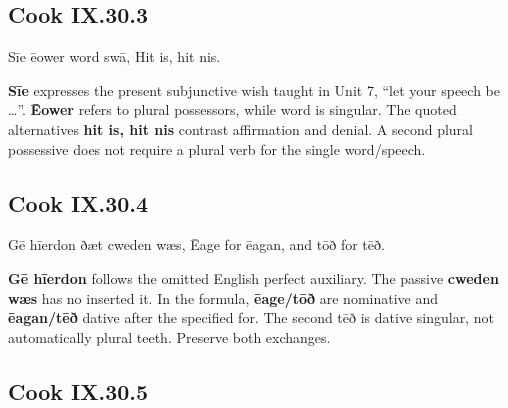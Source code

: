 \subsection*{Cook IX.30.3}

\par\begin{minipage}{\linewidth}\raggedright
Sīe ēower word swā, Hit is, hit nis.

\textbf{Sīe} expresses the present subjunctive wish taught in Unit 7, “let your speech be …”. \textbf{Ēower} refers to plural possessors, while word is singular. The quoted alternatives \textbf{hit is, hit nis} contrast affirmation and denial. A second plural possessive does not require a plural verb for the single word/\allowbreak{}speech.

\end{minipage}\par\addvspace{4pt}

\subsection*{Cook IX.30.4}

\par\begin{minipage}{\linewidth}\raggedright
Gē hīerdon ðæt cweden wæs, Ēage for ēagan, and tōð for tēð.

\textbf{Gē hīerdon} follows the omitted English perfect auxiliary. The passive \textbf{cweden wæs} has no inserted it. In the formula, \textbf{ēage/\allowbreak{}tōð} are nominative and \textbf{ēagan/\allowbreak{}tēð} dative after the specified for. The second tēð is dative singular, not automatically plural teeth. Preserve both exchanges.

\end{minipage}\par\addvspace{4pt}

\subsection*{Cook IX.30.5}

